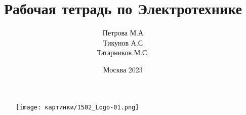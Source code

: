 \documentclass[a4paper, 10pt]{article}
\title{Рабочая тетрадь по Электротехнике}
\author{Петрова М.А \\Тикунов А.С \\Татарников М.С.}
\date{Москва 2023}
\begin{document}
\begin{figure}
   \texttt{[image: картинки/1502\_Logo-01.png]}
\end{figure}


\maketitle
\thispagestyle{empty}

\newpage
 \tableofcontents
\newpage
\onehalfspacing
\newpage



















\end{document}
